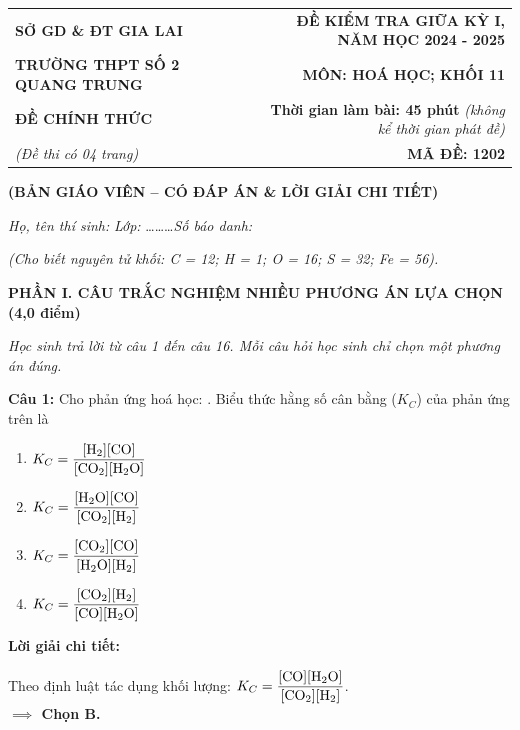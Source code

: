 \documentclass[10.5pt,a4paper]{article}
\newcommand{\loigiai}[1]{%
  \vspace{1pt}
  \begin{tcolorbox}
  {\color{myBlue}\bfseries Lời giải chi tiết:}\par\vspace{1pt}
  {\small #1}
  \end{tcolorbox}
  \vspace{2pt}
}
\begin{document}
\begin{tabularx}{\textwidth}{@{}l X r@{}}
\textbf{\small SỞ GD \& ĐT GIA LAI} & & \textbf{\small ĐỀ KIỂM TRA GIỮA KỲ I, NĂM HỌC 2024 - 2025} \\
\textbf{\normalsize TRƯỜNG THPT SỐ 2 QUANG TRUNG} & & \textbf{\normalsize MÔN: HOÁ HỌC; KHỐI 11} \\
\textbf{\small ĐỀ CHÍNH THỨC} & & \textbf{\small Thời gian làm bài: 45 phút} \textit{(không kể thời gian phát đề)} \\
\textit{\small (Đề thi có 04 trang)} & & \textbf{\normalsize MÃ ĐỀ: 1202}
\end{tabularx}

\begin{center}
{\color{myRed}\bfseries (BẢN GIÁO VIÊN -- CÓ ĐÁP ÁN \& LỜI GIẢI CHI TIẾT)}\par\vspace{2pt}
\textit{Họ, tên thí sinh:} \dotfill \quad \textit{Lớp:} \dots\dots\dots \quad \textit{Số báo danh:} \dotfill
\end{center}

\vspace{-2pt}
\noindent\textit{\small (Cho biết nguyên tử khối: C = 12; H = 1; O = 16; S = 32; Fe = 56).}
\vspace{-2pt}
\vspace{6pt}

{\color{myGreen}\large\bfseries PHẦN I. CÂU TRẮC NGHIỆM NHIỀU PHƯƠNG ÁN LỰA CHỌN (4,0 điểm)}

\textit{Học sinh trả lời từ câu 1 đến câu 16. Mỗi câu hỏi học sinh chỉ chọn một phương án đúng.}

\vspace{2pt}
\textbf{Câu 1:} Cho phản ứng hoá học: . Biểu thức hằng số cân bằng ($K_C$) của phản ứng trên là
\begin{enumerate}[label=\textbf{\Alph*.}, itemsep=1pt, topsep=1pt, leftmargin=1.5cm]
    \item $K_C = \dfrac{[\ce{H2}][\ce{CO}]}{[\ce{CO2}][\ce{H2O}]}$ \hfill \item \textbf{\color{myRed}$K_C = \dfrac{[\ce{H2O}][\ce{CO}]}{[\ce{CO2}][\ce{H2}]}$} \hfill \item $K_C = \dfrac{[\ce{CO2}][\ce{CO}]}{[\ce{H2O}][\ce{H2}]}$ \hfill \item $K_C = \dfrac{[\ce{CO2}][\ce{H2}]}{[\ce{CO}][\ce{H2O}]}$
\end{enumerate}
\loigiai{Theo định luật tác dụng khối lượng: $K_C = \dfrac{[\ce{CO}][\ce{H2O}]}{[\ce{CO2}][\ce{H2}]}$.\\ \textbf{$\implies$ Chọn B.}}
\end{document}

